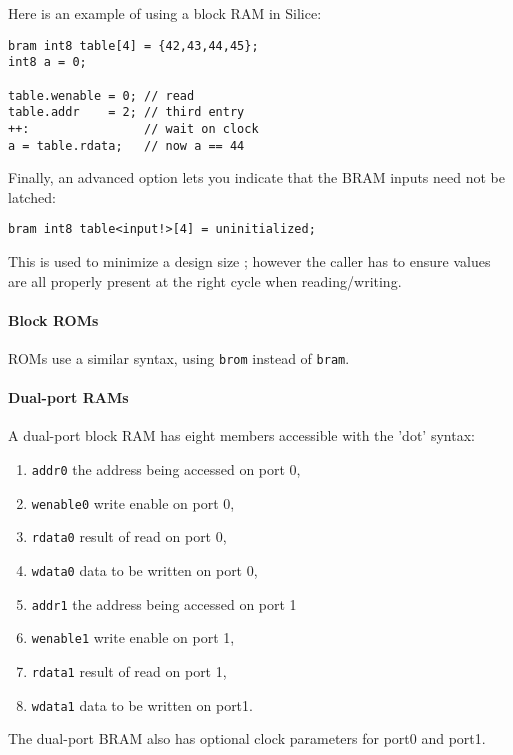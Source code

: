 \documentclass[a4]{article}
\newcommand\silice{Silice}
\begin{document}
Here is an example of using a block RAM in \silice{}:

\begin{verbatim}
bram int8 table[4] = {42,43,44,45};
int8 a = 0;

table.wenable = 0; // read
table.addr    = 2; // third entry
++:                // wait on clock
a = table.rdata;   // now a == 44
\end{verbatim}

Finally, an advanced option lets you indicate that the BRAM inputs need
not be latched:
\begin{verbatim}
bram int8 table<input!>[4] = uninitialized;
\end{verbatim}

This is used to minimize a design size ; however the caller has to ensure
values are all properly present at the right cycle when reading/writing.


\paragraph{Block ROMs}

ROMs use a similar syntax, using \texttt{brom} instead of \texttt{bram}.

\paragraph{Dual-port RAMs}

A dual-port block RAM has eight members accessible with the 'dot' syntax: 
\begin{enumerate}
	\item {\tt addr0} the address being accessed on port 0,
	\item {\tt wenable0} write enable on port 0,
	\item {\tt rdata0} result of read on port 0,
	\item {\tt wdata0} data to be written on port 0,
	\item {\tt addr1} the address being accessed on port 1
	\item {\tt wenable1} write enable on port 1,
	\item {\tt rdata1} result of read on port 1,
	\item {\tt wdata1} data to be written on port1.
\end{enumerate}

The dual-port BRAM also has optional clock parameters for port0 and port1.
\end{document}
